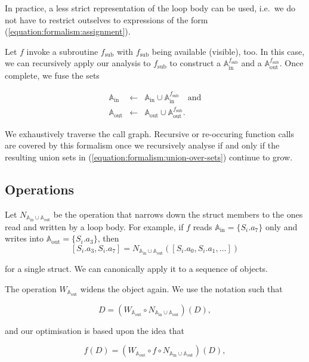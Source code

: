 \noindent
In practice, a less strict representation of the loop body can be used, i.e.~we do not have to restrict outselves to expressions of the form (\ref{equation:formalism:assignment}).

Let $f$ invoke a subroutine $f_{\text{sub}}$ with $f_{\text{sub}}$ being available (visible), too.
In this case, we can recursively apply our analysis to $f_{\text{sub}}$ to construct a $\mathbb{A}_{\text{in}}^{f_{\text{sub}}}$ and a $\mathbb{A}_{\text{out}}^{f_{\text{sub}}}$.
Once complete, we fuse the sets

\begin{eqnarray}
\mathbb{A}_{\text{in}} & \gets & \mathbb{A}_{\text{in}} \cup \mathbb{A}_{\text{in}}^{f_{\text{sub}}}
\quad \text{and} 
\label{equation:formalism:union-over-sets}
\\
\mathbb{A}_{\text{out}} & \gets & \mathbb{A}_{\text{out}} \cup \mathbb{A}_{\text{out}}^{f_{\text{sub}}}.
\nonumber
\end{eqnarray}

\noindent
We exhaustively traverse the call graph.
Recursive or re-occuring function calls are covered by this formalism once we recursively analyse if and only if the resulting union sets in 
(\ref{equation:formalism:union-over-sets}) continue to grow.



\subsection{Operations}

Let $N_{\mathbb{A}_{\text{in}} \cup \mathbb{A}_{\text{out}}}$ be the operation that narrows down the struct members to the ones read and written by a loop body.
For example, if $f$ reads $\mathbb{A}_{\text{in}} = \{ S_i.a_7 \}$ only and writes into $\mathbb{A}_{\text{out}} = \{S_i.a_3\}$, then 
\[
  [S_i.a_3,S_i.a_7] = N_{\mathbb{A}_{\text{in}} \cup \mathbb{A}_{\text{out}}}([S_i.a_0,S_i.a_1,\ldots])
\]


\noindent
for a single struct.
We can canonically apply it to a sequence of objects.


The operation $W_{\mathbb{A}_{\text{out}}}$ widens the object again. 
We use the notation such that 

\[
  D = \left( W_{\mathbb{A}_{\text{out}}} \circ N_{\mathbb{A}_{\text{in}} \cup \mathbb{A}_{\text{out}}} \right) (D),
\]

\noindent
and our optimisation is based upon the idea that 

\begin{equation}
  f(D) = \left( W_{\mathbb{A}_{\text{out}}} \circ f \circ N_{\mathbb{A}_{\text{in}} \cup \mathbb{A}_{\text{out}}} \right) (D),
    \label{equations:narrowing-widening}
\end{equation}

